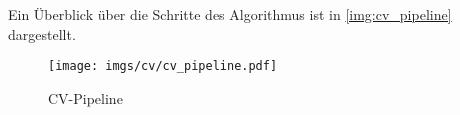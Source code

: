 Ein Überblick über die Schritte des Algorithmus ist in \autoref{img:cv_pipeline} dargestellt.

\begin{figure}
    \centering
    \texttt{[image: imgs/cv/cv\_pipeline.pdf]}
    \caption{CV-Pipeline}
    \label{img:cv_pipeline}
\end{figure}





